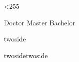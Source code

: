 %
%
%




\makeatletter  %
\loop %
  \catcode{}
  \ifnum\@tempcnta<255
    \advance \@tempcnta \@ne
  \repeat
\makeatother %






\newif\ifxueweidoctor
\newif\ifxueweimaster
\newif\ifxueweibachelor


\def\temp{Doctor}
\ifx\temp\xuewei %
  \xueweidoctortrue  \xueweimasterfalse \xueweibachelorfalse
\fi
\def\temp{Master}
\ifx\temp\xuewei
  \xueweidoctorfalse  \xueweimastertrue \xueweibachelorfalse
\fi
\def\temp{Bachelor}
\ifx\temp\xuewei
  \xueweidoctorfalse  \xueweimasterfalse \xueweibachelortrue
\fi


\ifxueweidoctor
  \newcommand{\cxuewei}{博士}
  \newcommand{\exuewei}{Doctor}
  \newcommand{\exueweier}{Doctoral}
  \newcommand{\xueweishort}{博}
\fi

\ifxueweimaster
  \newcommand{\cxuewei}{硕士}
  \newcommand{\exuewei}{Master}
  \newcommand{\exueweier}{Master}
  \newcommand{\xueweishort}{硕}
\fi

\ifxueweibachelor
  \newcommand{\cxuewei}{本科生}
  \newcommand{\exuewei}{Bachelor}
  \newcommand{\exueweier}{Bachelor}
  \newcommand{\xueweishort}{本}
\fi





\ifxueweidoctor %
  \def\oneortwoside{twoside}
\fi

\ifxueweidoctor %
  \def\oneortwoside{twoside}
\fi

\ifxueweibachelor %
  \def\oneortwoside{twoside}
\fi


\ifx\oneortwoside\undefined
  \def\oneortwoside{twoside}
\fi




\newif\ifoneortwoside


\def\temp{twoside}
\ifx\temp\oneortwoside
  \oneortwosidetrue
\else
  \oneortwosidefalse
\fi
